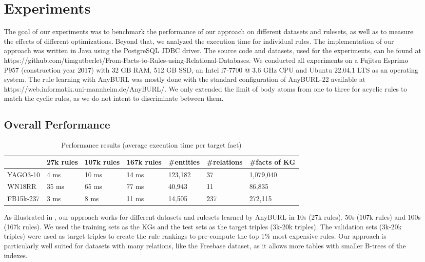 \documentclass[english]{lni}
\begin{document}
\section{Experiments}
The goal of our experiments was to benchmark the performance of our approach on different datasets and rulesets, as well as to measure the effects of different optimizations. Beyond that, we analyzed the execution time for individual rules. The implementation of our approach was written in Java using the PostgreSQL JDBC driver. The source code and datasets, used for the experiments, can be found at https://github.com/timgutberlet/From-Facts-to-Rules-using-Relational-Databases. We conducted all experiments on a Fujitsu Esprimo P957 (construction year 2017) with 32 GB RAM, 512 GB SSD, an Intel i7-7700 @ 3.6 GHz CPU and Ubuntu 22.04.1 LTS as an operating system. The rule learning with AnyBURL was mostly done with the standard configuration of AnyBURL-22 available at https://web.informatik.uni-mannheim.de/AnyBURL/. We only extended the limit of body atoms from one to three for acyclic rules to match the cyclic rules, as we do not intent to discriminate between them.

\subsection{Overall Performance}

\begin{table}[t]
\centering
\begin{tabular}{lllllll}
\toprule
 & 27k rules & 107k rules  & 167k rules & \#entities & \#relations & \#facts of KG\\
\midrule
YAGO3-10 & 4 ms & 10 ms & 14 ms & 123,182 & 37 & 1,079,040\\
WN18RR & 35 ms & 65 ms & 77 ms & 40,943 & 11 & 86,835\\
FB15k-237 & 3 ms & 8 ms & 11 ms & 14,505 & 237 & 272,115\\
\bottomrule
\end{tabular}
\caption{Performance results (average execution time per target fact)}
\label{tab:overall}
\end{table}

As illustrated in , our approach works for different datasets \cite{YAGO3}\cite{WN18RR}\cite{FB15k-237} and rulesets learned by AnyBURL in 10s (27k rules), 50s (107k rules) and 100s (167k rules). We used the training sets as the KGs and the test sets as the target triples (3k-20k triples). The validation sets (3k-20k triples) were used as target triples to create the rule rankings to pre-compute the top 1\% most expensive rules. Our approach is particularly well suited for datasets with many relations, like the Freebase dataset, as it allows more tables with smaller B-trees of the indexes.
\end{document}
